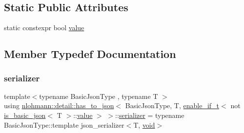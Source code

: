 \subsection*{Static Public Attributes}
\begin{DoxyCompactItemize}
\item 
static constexpr bool \hyperlink{structnlohmann_1_1detail_1_1has__to__json_3_01_basic_json_type_00_01_t_00_01enable__if__t_3_01nob111e71d40e2273c290d1ce5c6a3b84f_ac5e2f95bd9fa54c6ea870e923e395b63}{value}
\end{DoxyCompactItemize}


\subsection{Member Typedef Documentation}
\mbox{\label{structnlohmann_1_1detail_1_1has__to__json_3_01_basic_json_type_00_01_t_00_01enable__if__t_3_01nob111e71d40e2273c290d1ce5c6a3b84f_a479098e9480e0adb30fb3fe3586a8005}} 
\subsubsection{\texorpdfstring{serializer}{serializer}}
{\footnotesize\ttfamily template$<$typename Basic\+Json\+Type , typename T $>$ \\
using \hyperlink{structnlohmann_1_1detail_1_1has__to__json}{nlohmann\+::detail\+::has\+\_\+to\+\_\+json}$<$ Basic\+Json\+Type, T, \hyperlink{namespacenlohmann_1_1detail_a02bcbc878bee413f25b985ada771aa9c}{enable\+\_\+if\+\_\+t}$<$ not \hyperlink{structnlohmann_1_1detail_1_1is__basic__json}{is\+\_\+basic\+\_\+json}$<$ T $>$\+::\hyperlink{structnlohmann_1_1detail_1_1has__to__json_3_01_basic_json_type_00_01_t_00_01enable__if__t_3_01nob111e71d40e2273c290d1ce5c6a3b84f_ac5e2f95bd9fa54c6ea870e923e395b63}{value} $>$ $>$\+::\hyperlink{structnlohmann_1_1detail_1_1has__to__json_3_01_basic_json_type_00_01_t_00_01enable__if__t_3_01nob111e71d40e2273c290d1ce5c6a3b84f_a479098e9480e0adb30fb3fe3586a8005}{serializer} =  typename Basic\+Json\+Type\+::template json\+\_\+serializer$<$T, \hyperlink{namespacenlohmann_1_1detail_a59fca69799f6b9e366710cb9043aa77d}{void}$>$}



